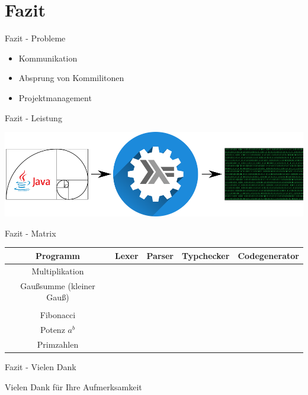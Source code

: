 \section{Fazit}

\begin{frame}{Fazit - Probleme}

\begin{itemize}
	\item Kommunikation
	\item Absprung von Kommilitonen
	\item Projektmanagement
\end{itemize}

\end{frame}


\begin{frame}{Fazit - Leistung}

\begin{center}
	\includegraphics{images/fazit/fazit.png}
\end{center}

\end{frame}


\begin{frame}{Fazit - Matrix}

\begin{center}
	\begin{tabular}{|c|c|c|c|c|}
		\hline
		Programm & Lexer & Parser & Typchecker & Codegenerator \\
		\hline
		Multiplikation & \checkmark & \checkmark & \checkmark & \checkmark \\
		\hline
		Gaußsumme (kleiner Gauß) & \checkmark & \checkmark & \checkmark & \checkmark \\
		\hline
		\text{Fakultät} & \checkmark & \checkmark & \checkmark & \checkmark \\
		\hline
		Fibonacci & \checkmark & \checkmark & \checkmark & \checkmark \\
		\hline
		Potenz $ a^{b} $ & \checkmark & \checkmark & \checkmark & \checkmark\\
		\hline
		Primzahlen & \checkmark & \checkmark & \checkmark & \checkmark \\ \hline
	\end{tabular}
\end{center}

\end{frame}


\begin{frame}{Fazit - Vielen Dank}

\begin{center}
	\Huge Vielen Dank für Ihre Aufmerksamkeit
\end{center}

\end{frame}
